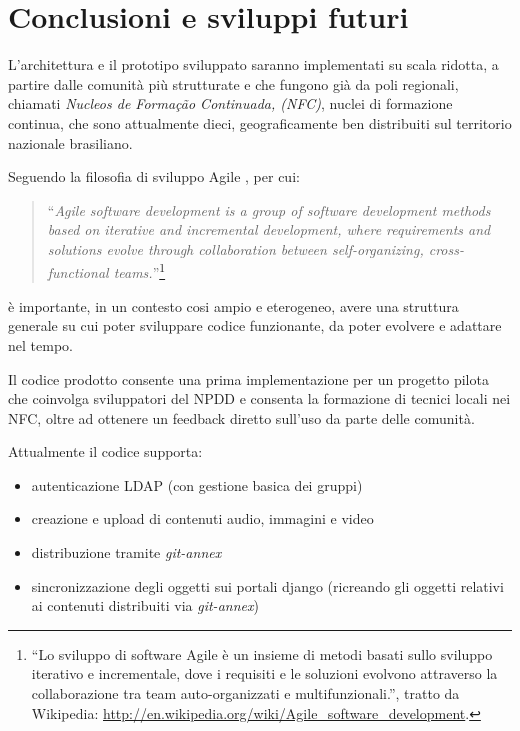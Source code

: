 
\chapter{Conclusioni e sviluppi futuri}
\label{Capitolo5}

L'architettura e il prototipo sviluppato saranno implementati su scala
ridotta, a partire dalle comunità più strutturate e che fungono già da
poli regionali, chiamati \emph{Nucleos de Formação Continuada, (NFC)},
nuclei di formazione continua, che sono attualmente dieci,
geograficamente ben distribuiti sul territorio nazionale brasiliano.

Seguendo la filosofia di sviluppo Agile \citep{Agile}, per cui: 

\begin{quote}
  ``\emph{Agile software development is a group of software
    development methods based on iterative and incremental
    development, where requirements and solutions evolve through
    collaboration between self-organizing, cross-functional
    teams.}''\footnote{``Lo sviluppo di software Agile è un insieme di
    metodi basati sullo sviluppo iterativo e incrementale, dove i
    requisiti e le soluzioni evolvono attraverso la collaborazione tra
    team auto-organizzati e multifunzionali.'', tratto da Wikipedia:
    \url{http://en.wikipedia.org/wiki/Agile_software_development}.}
\end{quote}

è importante, in un contesto cosi ampio e eterogeneo, avere una
struttura generale su cui poter sviluppare codice funzionante, da
poter evolvere e adattare nel tempo.

Il codice prodotto consente una prima implementazione per un progetto
pilota che coinvolga sviluppatori del NPDD e consenta la formazione di
tecnici locali nei NFC, oltre ad ottenere un feedback diretto sull'uso
da parte delle comunità.

Attualmente il codice supporta:
\begin{itemize}
\item autenticazione LDAP (con gestione basica dei gruppi)
\item creazione e upload di contenuti audio, immagini e video
\item distribuzione tramite \emph{git-annex}
\item sincronizzazione degli oggetti sui portali django (ricreando gli
  oggetti relativi ai contenuti distribuiti via \emph{git-annex})
\end{itemize}

